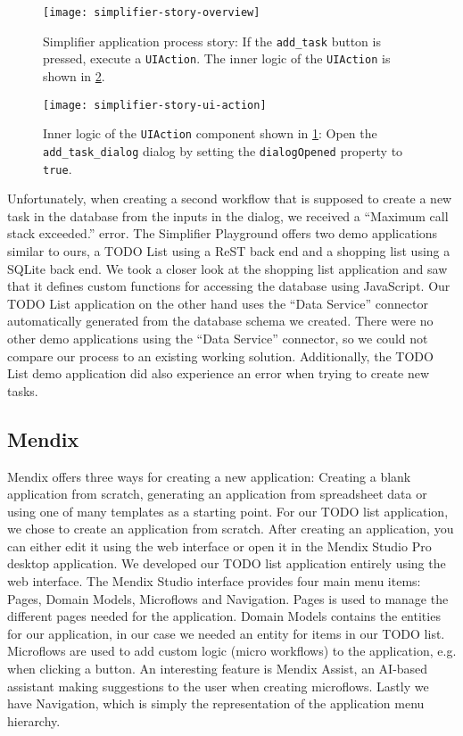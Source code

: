 \documentclass[runningheads]{llncs}
\begin{document}
\begin{figure}
  \centering
  \texttt{[image: simplifier-story-overview]}
  \caption{Simplifier application process story: If the \texttt{add\_task} button is pressed, execute a \texttt{UIAction}. The inner logic of the \texttt{UIAction} is shown in \cref{fig:simplifier_story_ui_action}.}
  \label{fig:simplifier_story_overview}
\end{figure}

\begin{figure}
  \centering
  \texttt{[image: simplifier-story-ui-action]}
  \caption{Inner logic of the \texttt{UIAction} component shown in \cref{fig:simplifier_story_overview}: Open the \texttt{add\_task\_dialog} dialog by setting the \texttt{dialogOpened} property to \texttt{true}.}
  \label{fig:simplifier_story_ui_action}
\end{figure}

Unfortunately, when creating a second workflow that is supposed to create a new task in the database from the inputs in the dialog, we received a “Maximum call stack exceeded.” error. The Simplifier Playground offers two demo applications similar to ours, a TODO List using a ReST back end and a shopping list using a SQLite back end. We took a closer look at the shopping list application and saw that it defines custom functions for accessing the database using JavaScript. Our TODO List application on the other hand uses the “Data Service” connector automatically generated from the database schema we created. There were no other demo applications using the “Data Service” connector, so we could not compare our process to an existing working solution. Additionally, the TODO List demo application did also experience an error when trying to create new tasks.

\subsection{Mendix}

Mendix offers three ways for creating a new application: Creating a blank application from scratch, generating an application from spreadsheet data or using one of many templates as a starting point. For our TODO list application, we chose to create an application from scratch. After creating an application, you can either edit it using the web interface or open it in the Mendix Studio Pro desktop application. We developed our TODO list application entirely using the web interface. The Mendix Studio interface provides four main menu items: Pages, Domain Models, Microflows and Navigation. Pages is used to manage the different pages needed for the application. Domain Models contains the entities for our application, in our case we needed an entity for items in our TODO list. Microflows are used to add custom logic (micro workflows) to the application, e.g. when clicking a button. An interesting feature is Mendix Assist, an AI-based assistant making suggestions to the user when creating microflows. Lastly we have Navigation, which is simply the representation of the application menu hierarchy.
\end{document}
